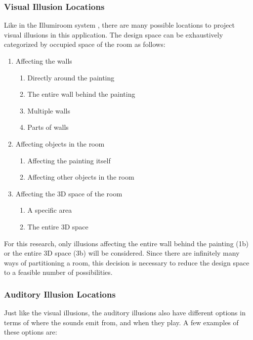 \documentclass[a4paper]{article}
\begin{document}
\subsubsection{Visual Illusion Locations}
Like in the Illumiroom system \cite{illumiroom}, there are many possible locations to project visual illusions in this application. The design space can be exhaustively categorized by occupied space of the room as follows:

\begin{enumerate}
\item Affecting the walls
\begin{enumerate}
\item Directly around the painting
\item The entire wall behind the painting
\item Multiple walls
\item Parts of walls
\end{enumerate}
\item Affecting objects in the room
\begin{enumerate}
\item Affecting the painting itself
\item Affecting other objects in the room
\end{enumerate}
\item Affecting the 3D space of the room
\begin{enumerate}
\item A specific area
\item The entire 3D space
\end{enumerate}
\end{enumerate}

For this research, only illusions affecting the entire wall behind the painting (1b) or the entire 3D space (3b) will be considered. Since there are infinitely many ways of partitioning a room, this decision is necessary to reduce the design space to a feasible number of possibilities. 

\subsubsection{Auditory Illusion Locations}
Just like the visual illusions, the auditory illusions also have different options in terms of where the sounds emit from, and when they play. A few examples of these options are:
\end{document}
